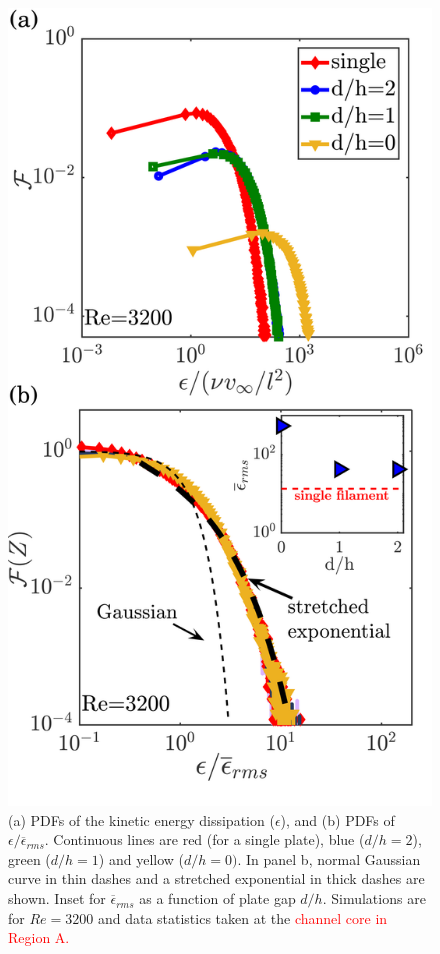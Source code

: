 \documentclass[aps,pre,twocolumn,aps,longbibliography]{revtex4-1}
\begin{document}
	\begin{figure}
		\begin{minipage}[c]{1\linewidth}
			\includegraphics[width=0.80\linewidth]{Fig18.pdf} 
		\end{minipage} 
		\caption{(a) PDFs of the kinetic energy dissipation ($\epsilon$), and (b) PDFs of $\epsilon/\overline{\epsilon}_{rms}$. Continuous lines are red (for a single plate), blue ($d/h=2$), green ($d/h=1$) and yellow ($d/h=0)$. In panel b, normal Gaussian curve in thin dashes and a stretched exponential in thick dashes are shown. Inset for $\overline{\epsilon}_{rms}$ as a function of plate gap $d/h$. Simulations are for $Re=3200$ and data statistics taken at the \textcolor{red}{channel core in Region A.}}
		\label{fig:doublefil_Re3200}
	\end{figure}
	
\end{document}
